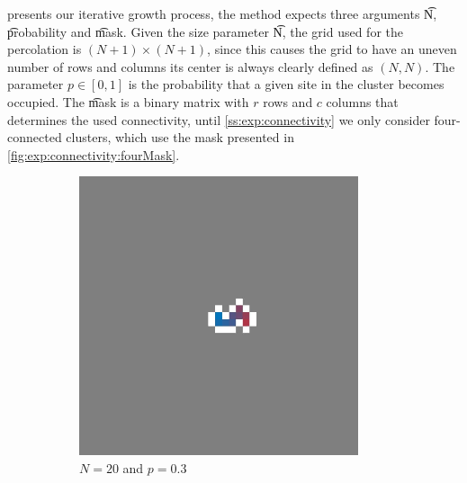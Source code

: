  presents our iterative growth process, the method  expects three arguments \t{N}, \t{probability} and \t{mask}. Given the size parameter \t{N}, the grid used for the percolation is $(N + 1) \times (N + 1)$, since this causes the grid to have an uneven number of rows and columns its center is always clearly defined as $(N, N)$. The parameter $p \in [0, 1]$ is the probability that a given site in the cluster becomes occupied. The \t{mask} is a binary matrix with $r$ rows and $c$ columns that determines the used connectivity, until \cref{ss:exp:connectivity} we only consider four-connected clusters, which use the mask presented in \cref{fig:exp:connectivity:fourMask}.\\

\begin{figure}
	\centering	
	\begin{subfigure}{0.27\textwidth}
		\centering
		\includegraphics[width=0.9\textwidth]{./img/fancy_cluster_N20_p3_rng_8}
		\caption{$N = 20$ and $p = 0.3$}
		\label{fig:method:fin_inf:finiteSmall}
	\end{subfigure}
	\begin{subfigure}{0.27\textwidth}
		\centering

\end{subfigure}
\end{figure}
